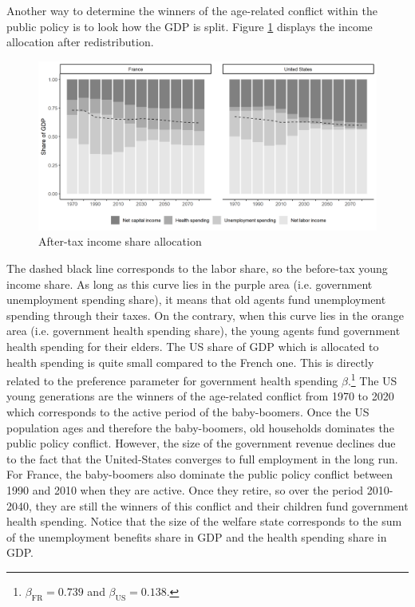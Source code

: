 Another way to determine the winners of the age-related conflict within the public policy is to look how the GDP is split. Figure \ref{fig:inc_gdp_shr} displays the income allocation after redistribution.
\begin{figure}[tb]
	\centering
	\includegraphics[width=1\linewidth]{../result/redistribution/redis_step3_stacked.png}
	\caption{After-tax income share allocation}
	\label{fig:inc_gdp_shr}
\end{figure}
The dashed black line corresponds to the labor share, so the before-tax young income share. As long as this curve lies in the purple area (i.e. government unemployment spending share), it means that old agents fund unemployment spending through their taxes. On the contrary, when this curve lies in the orange area (i.e. government health spending share), the young agents fund government health spending for their elders. The US share of GDP which is allocated to health spending is quite small compared to the French one. This is directly related to the preference parameter for government health spending $\beta$.\footnote{$\beta_{\text{FR}} = 0.739$ and $\beta_{\text{US}} = 0.138$.} The US young generations are the winners of the age-related conflict from 1970 to 2020 which corresponds to the active period of the baby-boomers. Once the US population ages and therefore the baby-boomers, old households dominates the public policy conflict. However, the size of the government revenue declines due to the fact that the United-States converges to full employment in the long run. For France, the baby-boomers also dominate the public policy conflict between 1990 and 2010 when they are active. Once they retire, so over the period 2010-2040, they are still the winners of this conflict and their children fund government health spending. Notice that the size of the welfare state corresponds to the sum of the unemployment benefits share in GDP and the health spending share in GDP.

